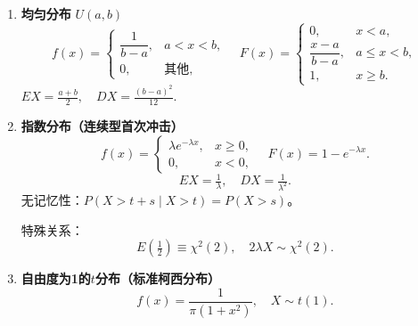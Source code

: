 \begin{enumerate}
      \item \textbf{均匀分布} $U(a,b)$
            \[
                  f(x)=
                  \begin{cases}
                        \dfrac{1}{b-a}, & a<x<b,     \\
                        0,              & \text{其他},
                  \end{cases}\quad
                  F(x)=
                  \begin{cases}
                        0,                & x<a,      \\
                        \dfrac{x-a}{b-a}, & a\le x<b, \\
                        1,                & x\ge b.
                  \end{cases}
            \]
            $E X=\tfrac{a+b}{2},\quad D X=\tfrac{(b-a)^2}{12}.$

      \item \textbf{指数分布（连续型首次冲击）}
            \[
                  f(x)=
                  \begin{cases}
                        \lambda e^{-\lambda x}, & x\ge0, \\
                        0,                      & x<0,
                  \end{cases}\quad
                  F(x)=1-e^{-\lambda x}.
            \]
            \[
                  E X=\tfrac{1}{\lambda},\quad D X=\tfrac{1}{\lambda^2}.
            \]
            无记忆性：$P(X>t+s\mid X>t)=P(X>s)$。

            \begin{note}{}{}
                  特殊关系：
                  \[
                        E\!\left(\tfrac12\right)\equiv\chi^2(2),\quad
                        2\lambda X\sim\chi^2(2).
                  \]
            \end{note}

      \item \textbf{自由度为1的$t$分布（标准柯西分布）}
            \[
                  f(x)=\frac{1}{\pi(1+x^2)},\quad X\sim t(1).
            \]


\end{enumerate}

